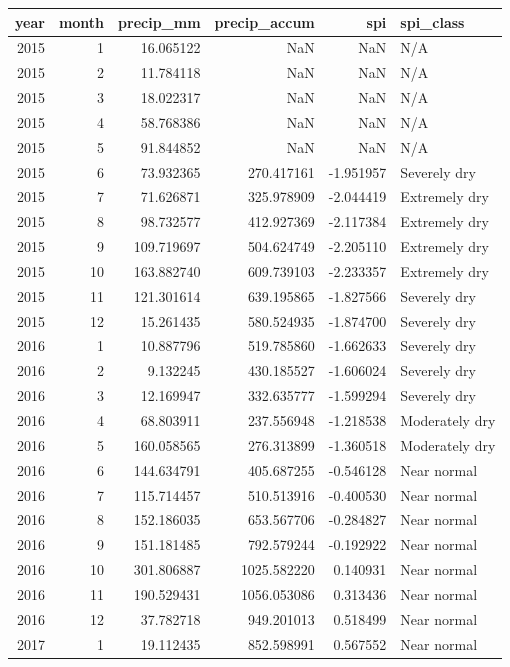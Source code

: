 \begin{tabular}{rrrrrl}
\toprule
year & month & precip\_mm & precip\_accum & spi & spi\_class \\
\midrule
2015 & 1 & 16.065122 & NaN & NaN & N/A \\
2015 & 2 & 11.784118 & NaN & NaN & N/A \\
2015 & 3 & 18.022317 & NaN & NaN & N/A \\
2015 & 4 & 58.768386 & NaN & NaN & N/A \\
2015 & 5 & 91.844852 & NaN & NaN & N/A \\
2015 & 6 & 73.932365 & 270.417161 & -1.951957 & Severely dry \\
2015 & 7 & 71.626871 & 325.978909 & -2.044419 & Extremely dry \\
2015 & 8 & 98.732577 & 412.927369 & -2.117384 & Extremely dry \\
2015 & 9 & 109.719697 & 504.624749 & -2.205110 & Extremely dry \\
2015 & 10 & 163.882740 & 609.739103 & -2.233357 & Extremely dry \\
2015 & 11 & 121.301614 & 639.195865 & -1.827566 & Severely dry \\
2015 & 12 & 15.261435 & 580.524935 & -1.874700 & Severely dry \\
2016 & 1 & 10.887796 & 519.785860 & -1.662633 & Severely dry \\
2016 & 2 & 9.132245 & 430.185527 & -1.606024 & Severely dry \\
2016 & 3 & 12.169947 & 332.635777 & -1.599294 & Severely dry \\
2016 & 4 & 68.803911 & 237.556948 & -1.218538 & Moderately dry \\
2016 & 5 & 160.058565 & 276.313899 & -1.360518 & Moderately dry \\
2016 & 6 & 144.634791 & 405.687255 & -0.546128 & Near normal \\
2016 & 7 & 115.714457 & 510.513916 & -0.400530 & Near normal \\
2016 & 8 & 152.186035 & 653.567706 & -0.284827 & Near normal \\
2016 & 9 & 151.181485 & 792.579244 & -0.192922 & Near normal \\
2016 & 10 & 301.806887 & 1025.582220 & 0.140931 & Near normal \\
2016 & 11 & 190.529431 & 1056.053086 & 0.313436 & Near normal \\
2016 & 12 & 37.782718 & 949.201013 & 0.518499 & Near normal \\
2017 & 1 & 19.112435 & 852.598991 & 0.567552 & Near normal \\

\end{tabular}
